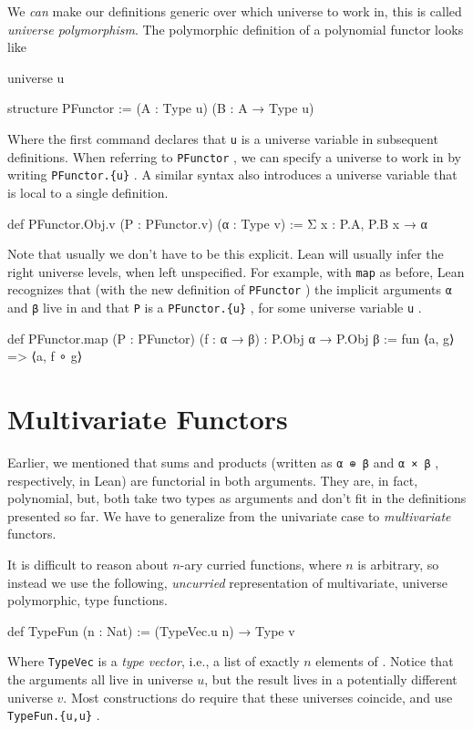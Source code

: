 \documentclass[titlepage]{report}
\newcommand\lean[1]{{%
\def\leanmode{1}%
\small \texttt{#1}%
\undef\leanmode%
}}
\newcommand\Typen[1]{\leanm{Type #1}}
\begin{document}
We \emph{can} make our definitions generic over which universe to work in, this is called \emph{universe polymorphism}. The polymorphic definition of a polynomial functor looks like
\begin{leancode}
    universe u

    structure PFunctor := (A : Type u) (B : A → Type u)
\end{leancode}
Where the first command declares that \lean{u} is a universe variable in subsequent definitions.
When referring to \lean{PFunctor}, we can specify a universe to work in by writing \lean{PFunctor.\{u\}}. A similar syntax also introduces a universe variable that is local to a single definition.

\begin{leancode}
    def PFunctor.Obj.{v} (P : PFunctor.{v}) (α : Type v)
        := Σ x : P.A, P.B x → α
\end{leancode}

Note that usually we don't have to be this explicit. Lean will usually infer the right universe levels, when left unspecified.
For example, with \lean{map} as before, Lean recognizes that (with the new definition of \lean{PFunctor}) the implicit arguments \lean{α} and \lean{β} live in \Typen{u} and that \lean{P} is a \lean{PFunctor.\{u\}}, for some universe variable \lean{u}.
\begin{leancode}
    def PFunctor.map (P : PFunctor) (f : α → β) : P.Obj α → P.Obj β 
        := fun ⟨a, g⟩ => ⟨a, f ∘ g⟩    
\end{leancode}


\section{Multivariate Functors}
Earlier, we mentioned that sums and products (written as \lean{α ⊕ β} and \lean{α × β}, respectively, in Lean) are functorial in both arguments.
They are, in fact, polynomial, but, both take two types as arguments and don't fit in the definitions presented so far. We have to generalize from the univariate case to \emph{multivariate} functors.

It is difficult to reason about $n$-ary curried functions, where $n$ is arbitrary, so instead we use the following, \emph{uncurried} representation of multivariate, universe polymorphic, type functions.

\begin{leancode}
    def TypeFun (n : Nat) := (TypeVec.{u} n) → Type v
\end{leancode}
Where \lean{TypeVec} is a \emph{type vector}, i.e., a list of exactly $n$ elements of \Typen{u}.
Notice that the arguments all live in universe $u$, but the result lives in a potentially different universe $v$. 
Most constructions do require that these universes coincide, and use \lean{TypeFun.\{u,u\}}.
\end{document}
